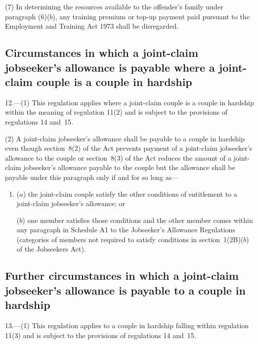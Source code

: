 \documentclass[12pt,a4paper]{article}
\begin{document}
(7) In determining the resources available to the offender’s family under paragraph (6)($b$), any training premium or top-up payment paid pursuant to the Employment and Training Act 1973 shall be disregarded.

\subsection[12. Circumstances in which a joint-claim jobseeker’s allowance is payable where a joint-claim couple is a couple in hardship]{Circumstances in which a joint-claim jobseeker’s allowance is payable where a joint-claim couple is a couple in hardship}

12.---(1)  This regulation applies where a joint-claim couple is a couple in hardship within the meaning of regulation 11(2) and is subject to the provisions of regulations 14 and~15.

(2) A joint-claim jobseeker’s allowance shall be payable to a couple in hardship even though section~8(2) of the Act prevents payment of a joint-claim jobseeker’s allowance to the couple or section~8(3) of the Act reduces the amount of a joint-claim jobseeker’s allowance payable to the couple but the allowance shall be payable under this paragraph only if and for so long as—
\begin{enumerate}\item[]
($a$) the joint-claim couple satisfy the other conditions of entitlement to a joint-claim jobseeker’s allowance; or

($b$) one member satisfies those conditions and the other member comes within any paragraph in Schedule A1 to the Jobseeker’s Allowance Regulations (categories of members not required to satisfy conditions in section~1(2B)($b$)  of the Jobseekers Act).
\end{enumerate}

\subsection[13. Further circumstances in which a joint-claim jobseeker’s allowance is payable to a couple in hardship]{Further circumstances in which a joint-claim jobseeker’s allowance is payable to a couple in hardship}

13.---(1)  This regulation applies to a couple in hardship falling within regulation 11(3) and is subject to the provisions of regulations 14 and~15.
\end{document}
